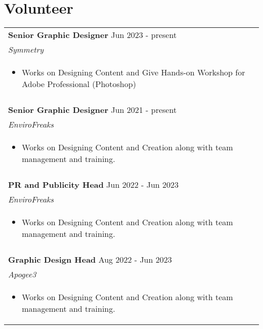 \documentclass[a4paper,16pt]{article}
\begin{document}
{{\section{Volunteer}
\begin{tabularx}{\linewidth}{ @{}l r@{} }
\textbf{Senior Graphic Designer} \hfill Jun 2023 - present \\
\textit{Symmetry}
\\
\begin{itemize}
    \item Works on Designing Content and Give Hands-on Workshop for Adobe Professional (Photoshop)
\end{itemize}\\
\\
\textbf{Senior Graphic Designer} \hfill Jun 2021 - present \\
\textit{EnviroFreaks}
\\
\begin{itemize}
    \item Works on Designing Content and Creation along with team management and training.
\end{itemize}\\\\
\textbf{PR and Publicity Head} \hfill Jun 2022 - Jun 2023 \\
\textit{EnviroFreaks}
\\
\begin{itemize}
    \item Works on Designing Content and Creation along with team management and training.
\end{itemize}\\\\
\textbf{Graphic Design Head} \hfill Aug 2022 - Jun 2023  \\
\textit{Apogee3}\\
\begin{itemize}
    \item Works on Designing Content and Creation along with team management and training.
\end{itemize}
\end{tabularx}
}}
\end{document}
